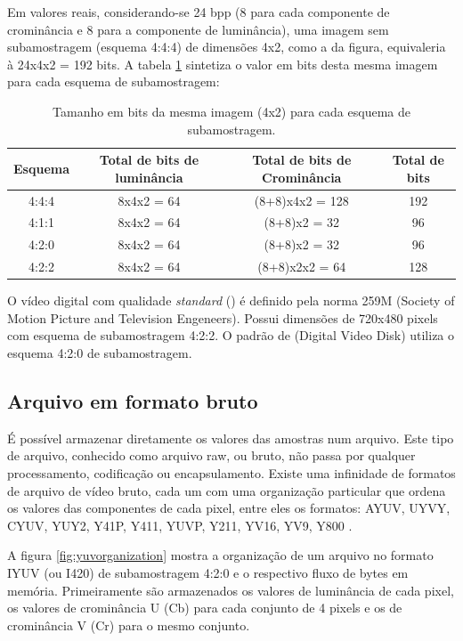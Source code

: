 Em valores reais, considerando-se 24 bpp (8 para cada componente de crominância e 8 para a componente de luminância), uma imagem sem subamostragem (esquema 4:4:4) de dimensões 4x2, como a da figura, equivaleria à 24x4x2 = 192 bits. A tabela \ref{tab:subsampling}  sintetiza o valor em bits desta mesma imagem para cada esquema de subamostragem:

\begin{table}[!h]
	\centering
	\caption{Tamanho em bits da mesma imagem (4x2) para cada esquema de subamostragem.}
	\label{tab:subsampling}
	\begin{tabular}{|c|c|c|c|}
		\hline
		Esquema & Total de bits de luminância & Total de bits de Crominância & Total de bits \\
	    \hline
		4:4:4 & 8x4x2 = 64 & (8+8)x4x2 = 128 & 192 \\
	    \hline
		4:1:1 & 8x4x2 = 64 & (8+8)x2 = 32 & 96 \\
	    \hline
		4:2:0 & 8x4x2 = 64 & (8+8)x2 = 32 & 96 \\
	    \hline
		4:2:2 & 8x4x2 = 64 & (8+8)x2x2 = 64 & 128 \\
		\hline
	\end{tabular}
\end{table}

O vídeo digital com qualidade \emph{standard} () é definido pela norma  259M (Society of Motion Picture and Television Engeneers). Possui dimensões de 720x480 pixels com esquema de subamostragem 4:2:2. O padrão de  (Digital Video Disk) utiliza o esquema 4:2:0 de subamostragem.

\subsection{Arquivo em formato bruto}

É possível armazenar diretamente os valores das amostras num arquivo. Este tipo de arquivo, conhecido como arquivo raw, ou bruto, não passa por qualquer processamento, codificação ou encapsulamento. Existe uma infinidade de formatos de arquivo de vídeo bruto, cada um com uma organização particular que ordena os valores das componentes de cada pixel, entre eles os formatos: AYUV, UYVY, CYUV, YUY2, Y41P, Y411, YUVP, Y211, YV16, YV9, Y800 \cite{fourccyuv}. %

A figura \ref{fig:yuvorganization} mostra a organização de um arquivo no formato IYUV (ou I420) de subamostragem 4:2:0 e o respectivo fluxo de bytes em memória. Primeiramente são armazenados os valores de luminância de cada pixel, os valores de crominância U (Cb) para cada conjunto de 4 pixels e os de crominância V (Cr) para o mesmo conjunto.

